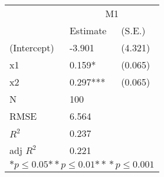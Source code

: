 \begin{tabular}{*{3}{l}}
\hline
                  & \multicolumn{2}{c}{M1}   \tabularnewline
                   &Estimate  &(S.E.)  \tabularnewline
 \hline
 \hline
   (Intercept)     &-3.901   &   (4.321) \tabularnewline
   x1              &0.159*   &   (0.065) \tabularnewline
   x2              &0.297***   &   (0.065) \tabularnewline
 \hline
 N                 &100       &        \tabularnewline
 RMSE             &6.564         & \tabularnewline
 $R^2$             &0.237         & \tabularnewline
 adj $R^2$         &0.221         & \tabularnewline
 \hline
\hline
 
 \multicolumn{3}{c}{${*  p}\le 0.05$${*\!\!*  p}\le 0.01$${*\!\!*\!\!*  p}\le 0.001$}\tabularnewline
 \end{tabular}